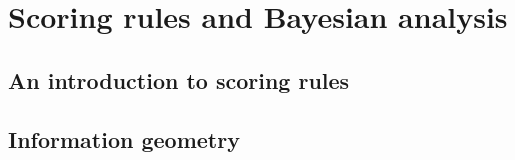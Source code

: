 \part{Scoring rules and Bayesian analysis}

\chapter{An introduction to scoring rules\label{sec:scoring_rules}}


\chapter{Information geometry\label{sec:embeddings}}


% 
